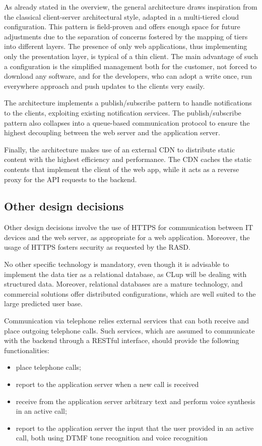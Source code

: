 \documentclass[../../main.tex]{subfiles}
\begin{document}
As already stated in the overview, the general architecture draws inspiration from the classical client-server architectural style, adapted in a multi-tiered cloud configuration.  
This pattern is field-proven and offers enough space for future adjustments due to the separation of concerns fostered by the mapping of tiers into different layers.
The presence of only web applications, thus implementing only the presentation layer, is typical of a thin client. The main advantage of such a configuration is the simplified management both for the customer, not forced to download any software, and for the developers, who can adopt a write once, run everywhere approach and push updates to the clients very easily.

The architecture implements a publish/subscribe pattern to handle notifications to the clients, exploiting existing notification services. 
The publish/subscribe pattern also collapses into a queue-based communication protocol to ensure the highest decoupling between the web server and the application server.

Finally, the architecture makes use of an external CDN to distribute static content with the highest efficiency and performance. The CDN caches the static contents that implement the client of the web app, while it acts as a reverse proxy for the API requests to the backend.

\subsection{Other design decisions}


    Other design decisions involve the use of HTTPS for communication between IT devices and the web server, as appropriate for a web application. 
    Moreover, the usage of HTTPS fosters security as requested by the RASD.

    No other specific technology is mandatory, even though it is advisable to implement the data tier as a relational database, 
    as CLup will be dealing with structured data. Moreover, relational databases are a mature technology, and commercial solutions offer distributed configurations, 
    which are well suited to the large predicted user base.

    Communication via telephone relies external services that can both receive and place outgoing telephone calls. Such services, which are assumed to communicate with the backend through a RESTful interface, should provide the following functionalities:
    \begin{itemize}
        \item place telephone calls;
        \item report to the application server when a new call is received
        \item receive from the application server arbitrary text and perform voice synthesis in an active call;
        \item report to the application server the input that the user provided in an active call, both using DTMF tone recognition and voice recognition
    \end{itemize}
\end{document}
